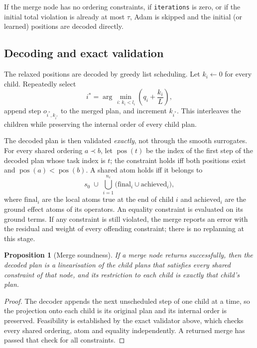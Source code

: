 \documentclass[11pt,a4paper]{article}
\newtheorem{proposition}[definition]{Proposition}
\newcommand{\pos}{\operatorname{pos}}
\begin{document}
If the merge node has no ordering constraints, if \texttt{iterations} is zero,
or if the initial total violation is already at most $\tau$, Adam is skipped
and the initial (or learned) positions are decoded directly.

\subsection{Decoding and exact validation}
The relaxed positions are decoded by greedy list scheduling. Let
$k_i\leftarrow0$ for every child. Repeatedly select
\begin{equation}
i^*=\arg\min_{\,i:\,k_i<l_i}\left(q_i+\frac{k_i}{L}\right),
\end{equation}
append step $o_{i^*,k_{i^*}}$ to the merged plan, and increment $k_{i^*}$.
This interleaves the children while preserving the internal order of every
child plan.

The decoded plan is then validated \emph{exactly}, not through the smooth
surrogates. For every shared ordering $a\prec b$, let $\pos(t)$ be the index of
the first step of the decoded plan whose task index is $t$; the constraint
holds iff both positions exist and $\pos(a)<\pos(b)$. A shared atom holds iff
it belongs to
\begin{equation}
s_0\;\cup\;\bigcup_{i=1}^{n_c}\bigl(\mathrm{final}_i\cup\mathrm{achieved}_i\bigr),
\end{equation}
where $\mathrm{final}_i$ are the local atoms true at the end of child $i$ and
$\mathrm{achieved}_i$ are the ground effect atoms of its operators. An equality
constraint is evaluated on its ground terms. If any constraint is still
violated, the merge reports an error with the residual and weight of every
offending constraint; there is no replanning at this stage.

\begin{proposition}[Merge soundness]
If a merge node returns successfully, then the decoded plan is a linearisation
of the child plans that satisfies every shared constraint of that node, and
its restriction to each child is exactly that child's plan.
\end{proposition}
\begin{proof}
The decoder appends the next unscheduled step of one child at a time, so the
projection onto each child is its original plan and its internal order is
preserved. Feasibility is established by the exact validator above, which
checks every shared ordering, atom and equality independently. A returned
merge has passed that check for all constraints.
\end{proof}
\end{document}
